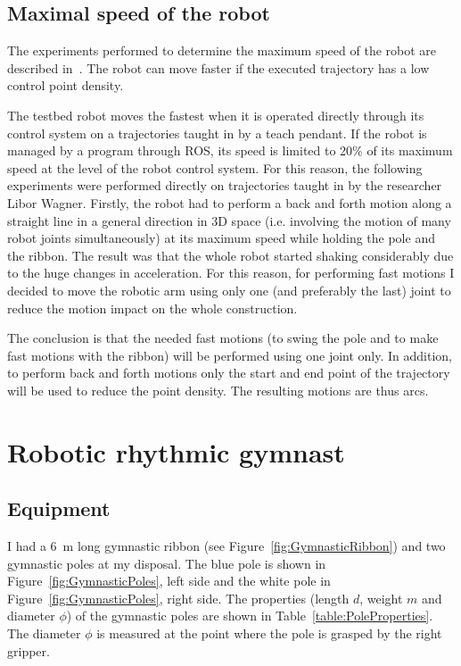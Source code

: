         \subsection{Maximal speed of the \CloPeMa\/ robot}
            The experiments performed to determine the maximum speed of the robot are described in~\cite{WagnerMaxRobotSpeed}. The robot can move faster if the executed trajectory has a low control point density.

            The \CloPeMa\/ testbed robot moves the fastest when it is operated directly through its control system on a trajectories taught in by a teach pendant. If the robot is managed by a program through ROS, its speed is limited to 20\% of its maximum speed at the level of the robot control system. For this reason, the following experiments were performed directly on trajectories taught in by the \CloPeMa\/ researcher Libor Wagner. Firstly, the robot had to perform a back and forth motion along a straight line in a general direction in 3D space (i.e. involving the motion of many robot joints simultaneously) at its maximum speed while holding the pole and the ribbon. The result was that the whole robot started shaking considerably due to the huge changes in acceleration. For this reason, for performing fast motions I decided to move the robotic arm using only one (and preferably the last) joint to reduce the motion impact on the whole construction.

            The conclusion is that the needed fast motions (to swing the pole and to make fast motions with the ribbon) will be performed using one joint only. In addition, to perform back and forth motions only the start and end point of the trajectory will be used to reduce the point density. The resulting motions are thus arcs.

    \section{Robotic rhythmic gymnast}
        \subsection{Equipment}
            I had a \SI{6}{m} long gymnastic ribbon (see Figure~\ref{fig:GymnasticRibbon}) and two gymnastic poles  at my disposal. The blue pole is shown in Figure~\ref{fig:GymnasticPoles}, left side  and the white pole in Figure~\ref{fig:GymnasticPoles}, right side. The properties (length $d$, weight $m$ and diameter $\phi$) of the gymnastic poles are shown in Table~\ref{table:PoleProperties}. The diameter $\phi$ is measured at the point where the pole is grasped by the right gripper.

